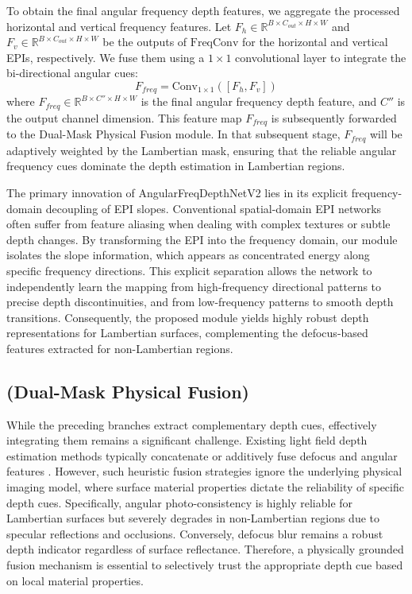 \documentclass[lettersize,journal]{IEEEtran}
\begin{document}
To obtain the final angular frequency depth features, we aggregate the processed horizontal and vertical frequency features. Let $F_{h} \in \mathbb{R}^{B \times C_{out} \times H \times W}$ and $F_{v} \in \mathbb{R}^{B \times C_{out} \times H \times W}$ be the outputs of $\text{FreqConv}$ for the horizontal and vertical EPIs, respectively. We fuse them using a $1 \times 1$ convolutional layer to integrate the bi-directional angular cues:
\begin{equation}
\label{eq:eq7}
F_{freq} = \text{Conv}_{1 \times 1}([F_{h}, F_{v}])
\end{equation}
where $F_{freq} \in \mathbb{R}^{B \times C'' \times H \times W}$ is the final angular frequency depth feature, and $C''$ is the output channel dimension. This feature map $F_{freq}$ is subsequently forwarded to the Dual-Mask Physical Fusion module. In that subsequent stage, $F_{freq}$ will be adaptively weighted by the Lambertian mask, ensuring that the reliable angular frequency cues dominate the depth estimation in Lambertian regions.

The primary innovation of AngularFreqDepthNetV2 lies in its explicit frequency-domain decoupling of EPI slopes. Conventional spatial-domain EPI networks often suffer from feature aliasing when dealing with complex textures or subtle depth changes. By transforming the EPI into the frequency domain, our module isolates the slope information, which appears as concentrated energy along specific frequency directions. This explicit separation allows the network to independently learn the mapping from high-frequency directional patterns to precise depth discontinuities, and from low-frequency patterns to smooth depth transitions. Consequently, the proposed module yields highly robust depth representations for Lambertian surfaces, complementing the defocus-based features extracted for non-Lambertian regions.

\subsection{(Dual-Mask Physical Fusion)}

While the preceding branches extract complementary depth cues, effectively integrating them remains a significant challenge. Existing light field depth estimation methods typically concatenate or additively fuse defocus and angular features . However, such heuristic fusion strategies ignore the underlying physical imaging model, where surface material properties dictate the reliability of specific depth cues. Specifically, angular photo-consistency is highly reliable for Lambertian surfaces but severely degrades in non-Lambertian regions due to specular reflections and occlusions. Conversely, defocus blur remains a robust depth indicator regardless of surface reflectance. Therefore, a physically grounded fusion mechanism is essential to selectively trust the appropriate depth cue based on local material properties.
\end{document}
